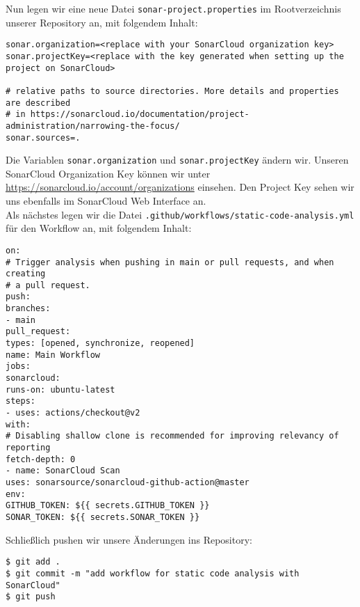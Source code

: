 \noindent
Nun legen wir eine neue Datei \verb|sonar-project.properties|
im Rootverzeichnis unserer Repository an, mit folgendem Inhalt:

\begin{verbatim}
sonar.organization=<replace with your SonarCloud organization key>
sonar.projectKey=<replace with the key generated when setting up the project on SonarCloud>

# relative paths to source directories. More details and properties are described
# in https://sonarcloud.io/documentation/project-administration/narrowing-the-focus/
sonar.sources=.
\end{verbatim}

\noindent
Die Variablen \verb|sonar.organization| und
\verb|sonar.projectKey| ändern wir.
Unseren SonarCloud Organization Key können wir unter
\url{https://sonarcloud.io/account/organizations}
einsehen. 
Den Project Key sehen wir uns ebenfalls im SonarCloud 
Web Interface an. \\

\noindent
Als nächstes legen wir die Datei
\verb|.github/workflows/static-code-analysis.yml| 
für den Workflow an, mit folgendem Inhalt:

\begin{verbatim}
on:
# Trigger analysis when pushing in main or pull requests, and when creating
# a pull request.
push:
branches:
- main
pull_request:
types: [opened, synchronize, reopened]
name: Main Workflow
jobs:
sonarcloud:
runs-on: ubuntu-latest
steps:
- uses: actions/checkout@v2
with:
# Disabling shallow clone is recommended for improving relevancy of reporting
fetch-depth: 0
- name: SonarCloud Scan
uses: sonarsource/sonarcloud-github-action@master
env:
GITHUB_TOKEN: ${{ secrets.GITHUB_TOKEN }}
SONAR_TOKEN: ${{ secrets.SONAR_TOKEN }}
\end{verbatim}

\noindent
Schließlich pushen wir unsere Änderungen ins Repository:

\begin{verbatim}
$ git add .
$ git commit -m "add workflow for static code analysis with SonarCloud"
$ git push
\end{verbatim}







